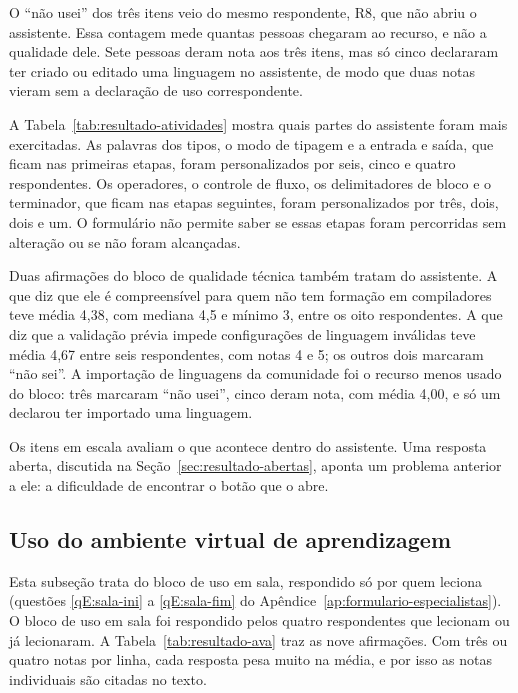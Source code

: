 O ``não usei'' dos três itens veio do mesmo respondente, R8, que não abriu o assistente. Essa contagem mede quantas pessoas chegaram ao recurso, e não a qualidade dele. Sete pessoas deram nota aos três itens, mas só cinco declararam ter criado ou editado uma linguagem no assistente, de modo que duas notas vieram sem a declaração de uso correspondente.

A Tabela~\ref{tab:resultado-atividades} mostra quais partes do assistente foram mais exercitadas. As palavras dos tipos, o modo de tipagem e a entrada e saída, que ficam nas primeiras etapas, foram personalizados por seis, cinco e quatro respondentes. Os operadores, o controle de fluxo, os delimitadores de bloco e o terminador, que ficam nas etapas seguintes, foram personalizados por três, dois, dois e um. O formulário não permite saber se essas etapas foram percorridas sem alteração ou se não foram alcançadas.

Duas afirmações do bloco de qualidade técnica também tratam do assistente. A que diz que ele é compreensível para quem não tem formação em compiladores teve média 4,38, com mediana 4,5 e mínimo 3, entre os oito respondentes. A que diz que a validação prévia impede configurações de linguagem inválidas teve média 4,67 entre seis respondentes, com notas 4 e 5; os outros dois marcaram ``não sei''. A importação de linguagens da comunidade foi o recurso menos usado do bloco: três marcaram ``não usei'', cinco deram nota, com média 4,00, e só um declarou ter importado uma linguagem.

Os itens em escala avaliam o que acontece dentro do assistente. Uma resposta aberta, discutida na Seção~\ref{sec:resultado-abertas}, aponta um problema anterior a ele: a dificuldade de encontrar o botão que o abre.

\subsection{Uso do ambiente virtual de aprendizagem}
\label{sec:resultado-ava}

Esta subseção trata do bloco de uso em sala, respondido só por quem leciona (questões \ref{qE:sala-ini} a \ref{qE:sala-fim} do Apêndice~\ref{ap:formulario-especialistas}). O bloco de uso em sala foi respondido pelos quatro respondentes que lecionam ou já lecionaram. A Tabela~\ref{tab:resultado-ava} traz as nove afirmações. Com três ou quatro notas por linha, cada resposta pesa muito na média, e por isso as notas individuais são citadas no texto.

